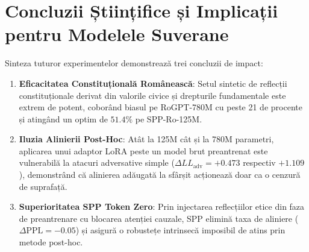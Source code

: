 \documentclass[11pt,a4paper]{article}
\begin{document}
\section{Concluzii Științifice și Implicații pentru Modelele Suverane}

Sinteza tuturor experimentelor demonstrează trei concluzii de impact:
\begin{enumerate}
    \item \textbf{Eficacitatea Constituțională Românească}: Setul sintetic de reflecții constituționale derivat din valorile civice și drepturile fundamentale este extrem de potent, coborând biasul pe RoGPT-780M cu peste 21 de procente și atingând un optim de $51.4\%$ pe SPP-Ro-125M.
    \item \textbf{Iluzia Alinierii Post-Hoc}: Atât la 125M cât și la 780M parametri, aplicarea unui adaptor LoRA peste un model brut preantrenat este vulnerabilă la atacuri adversative simple ($\Delta LL_{\text{adv}} = +0.473$ respectiv $+1.109$), demonstrând că alinierea adăugată la sfârșit acționează doar ca o cenzură de suprafață.
    \item \textbf{Superioritatea SPP Token Zero}: Prin injectarea reflecțiilor etice din faza de preantrenare cu blocarea atenției cauzale, SPP elimină taxa de aliniere ($\Delta\text{PPL} = -0.05$) și asigură o robustețe intrinsecă imposibil de atins prin metode post-hoc.
\end{enumerate}
\end{document}
